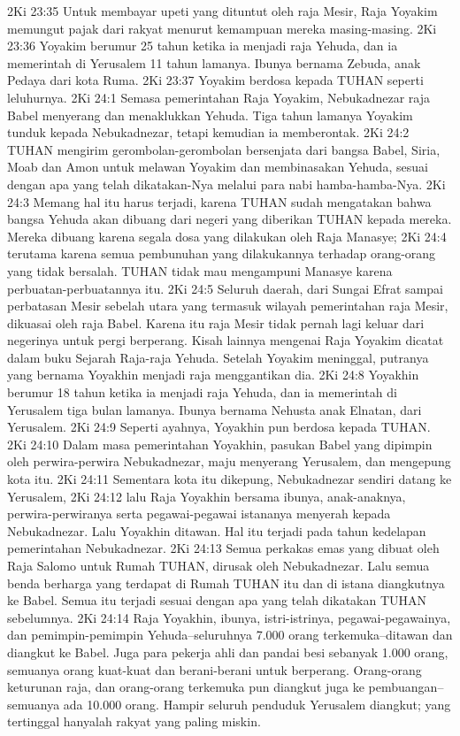 2Ki 23:35  Untuk membayar upeti yang dituntut oleh raja Mesir, Raja Yoyakim memungut pajak dari rakyat menurut kemampuan mereka masing-masing.
2Ki 23:36  Yoyakim berumur 25 tahun ketika ia menjadi raja Yehuda, dan ia memerintah di Yerusalem 11 tahun lamanya. Ibunya bernama Zebuda, anak Pedaya dari kota Ruma.
2Ki 23:37  Yoyakim berdosa kepada TUHAN seperti leluhurnya.
2Ki 24:1  Semasa pemerintahan Raja Yoyakim, Nebukadnezar raja Babel menyerang dan menaklukkan Yehuda. Tiga tahun lamanya Yoyakim tunduk kepada Nebukadnezar, tetapi kemudian ia memberontak.
2Ki 24:2  TUHAN mengirim gerombolan-gerombolan bersenjata dari bangsa Babel, Siria, Moab dan Amon untuk melawan Yoyakim dan membinasakan Yehuda, sesuai dengan apa yang telah dikatakan-Nya melalui para nabi hamba-hamba-Nya.
2Ki 24:3  Memang hal itu harus terjadi, karena TUHAN sudah mengatakan bahwa bangsa Yehuda akan dibuang dari negeri yang diberikan TUHAN kepada mereka. Mereka dibuang karena segala dosa yang dilakukan oleh Raja Manasye;
2Ki 24:4  terutama karena semua pembunuhan yang dilakukannya terhadap orang-orang yang tidak bersalah. TUHAN tidak mau mengampuni Manasye karena perbuatan-perbuatannya itu.
2Ki 24:5  Seluruh daerah, dari Sungai Efrat sampai perbatasan Mesir sebelah utara yang termasuk wilayah pemerintahan raja Mesir, dikuasai oleh raja Babel. Karena itu raja Mesir tidak pernah lagi keluar dari negerinya untuk pergi berperang. Kisah lainnya mengenai Raja Yoyakim dicatat dalam buku Sejarah Raja-raja Yehuda. Setelah Yoyakim meninggal, putranya yang bernama Yoyakhin menjadi raja menggantikan dia.
2Ki 24:8  Yoyakhin berumur 18 tahun ketika ia menjadi raja Yehuda, dan ia memerintah di Yerusalem tiga bulan lamanya. Ibunya bernama Nehusta anak Elnatan, dari Yerusalem.
2Ki 24:9  Seperti ayahnya, Yoyakhin pun berdosa kepada TUHAN.
2Ki 24:10  Dalam masa pemerintahan Yoyakhin, pasukan Babel yang dipimpin oleh perwira-perwira Nebukadnezar, maju menyerang Yerusalem, dan mengepung kota itu.
2Ki 24:11  Sementara kota itu dikepung, Nebukadnezar sendiri datang ke Yerusalem,
2Ki 24:12  lalu Raja Yoyakhin bersama ibunya, anak-anaknya, perwira-perwiranya serta pegawai-pegawai istananya menyerah kepada Nebukadnezar. Lalu Yoyakhin ditawan. Hal itu terjadi pada tahun kedelapan pemerintahan Nebukadnezar.
2Ki 24:13  Semua perkakas emas yang dibuat oleh Raja Salomo untuk Rumah TUHAN, dirusak oleh Nebukadnezar. Lalu semua benda berharga yang terdapat di Rumah TUHAN itu dan di istana diangkutnya ke Babel. Semua itu terjadi sesuai dengan apa yang telah dikatakan TUHAN sebelumnya.
2Ki 24:14  Raja Yoyakhin, ibunya, istri-istrinya, pegawai-pegawainya, dan pemimpin-pemimpin Yehuda--seluruhnya 7.000 orang terkemuka--ditawan dan diangkut ke Babel. Juga para pekerja ahli dan pandai besi sebanyak 1.000 orang, semuanya orang kuat-kuat dan berani-berani untuk berperang. Orang-orang keturunan raja, dan orang-orang terkemuka pun diangkut juga ke pembuangan--semuanya ada 10.000 orang. Hampir seluruh penduduk Yerusalem diangkut; yang tertinggal hanyalah rakyat yang paling miskin.
